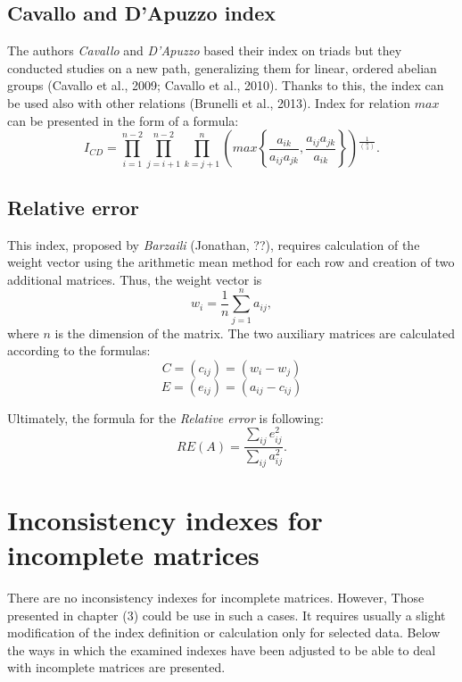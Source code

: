 \subsection{Cavallo and D’Apuzzo index}

The authors \textit{Cavallo} and \textit{D'Apuzzo} based their index on triads but they conducted studies on a new path, generalizing them for linear, ordered abelian groups (Cavallo et al., 2009; Cavallo et al., 2010). Thanks to this, the index can be used also with other relations (Brunelli et al., 2013). Index for relation $max$ can be presented in the form of a formula:
	\begin{equation} 
		I_{CD}=\prod_{i=1}^{n-2}\prod_{j=i+1}^{n-2}\prod_{k=j+1}^{n}\left(max\left\{ \frac{a_{ik}}{a_{ij}a_{jk}},\frac{a_{ij}a_{jk}}{a_{ik}}\right\} \right){}^{\frac{1}{\binom{n}{3}}}.
	 \end{equation}
 

\subsection{Relative error}

This index, proposed by \textit{Barzaili} (Jonathan, ??), requires calculation of the weight vector using the arithmetic mean method for each row and creation of two additional matrices. Thus, the weight vector is $$w_{i}=\frac{1}{n}\sum_{j=1}^{n}a_{ij},$$ where $n$ is the dimension of the matrix. The two auxiliary matrices are calculated according to the formulas:
$$C=\left(c_{ij}\right)=\left(w_{i}-w_{j}\right)$$
$$E=\left(e_{ij}\right)=\left(a_{ij}-c_{ij}\right)$$

Ultimately, the formula for the \textit{Relative error} is following:
	\begin{equation} 
		RE(A)=\frac{\sum_{ij}e_{ij}^{2}}{\sum_{ij}a_{ij}^{2}}.
	 \end{equation}


\section{Inconsistency indexes for incomplete matrices}
\label{sec:inconsistencyIndexesForIncompleteMatrices}

There are no inconsistency indexes for incomplete matrices. However, Those presented in chapter (3) could be use in such a cases. It requires usually a slight modification of the index definition or calculation only for selected data. Below the ways in which the examined indexes have been adjusted to be able to deal with incomplete matrices are presented.

